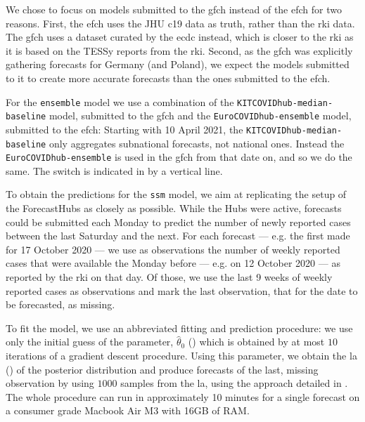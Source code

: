 We chose to focus on models submitted to the \acrshort{gfch} instead of the \acrshort{efch} for two reasons. 
First, the \acrshort{efch} uses the JHU \acrshort{c19} data \citep{Dong2020} as truth, rather than the \acrshort{rki} data. The \acrshort{gfch} uses a dataset curated by the \acrshort{ecdc} instead, which is closer to the \acrshort{rki} as it is based on the TESSy reports from the \acrshort{rki}. Second, as the \acrshort{gfch} was explicitly gathering forecasts for Germany (and Poland), we expect the models submitted to it to create more accurate forecasts than the ones submitted to the \acrshort{efch}. 

For the \texttt{ensemble} model we use a combination of the \texttt{KITCOVIDhub-median-baseline} model, submitted to the \acrshort{gfch} and the \texttt{EuroCOVIDhub-ensemble} model, submitted to the \acrshort{efch}: Starting with 10 April 2021, the \texttt{KITCOVIDhub-median-baseline} only aggregates subnational forecasts, not national ones. Instead the \texttt{EuroCOVIDhub-ensemble} is used in the \acrshort{gfch} from that date on, and so we do the same. The switch is indicated in  by a vertical line. 

To obtain the predictions for the \texttt{ssm} model, we aim at replicating the setup of the ForecastHubs as closely as possible. While the Hubs were active, forecasts could be submitted each Monday to predict the number of newly reported cases between the last Saturday and the next. For each forecast --- e.g. the first made for 17 October 2020 --- we use as observations the number of weekly reported cases that were available the Monday before --- e.g. on 12 October 2020 --- as reported by the \acrshort{rki} on that day. Of those, we use the last 9 weeks of weekly reported cases as observations and mark the last observation, that for the date to be forecasted, as missing. 

To fit the model, we use an abbreviated fitting and prediction procedure: we use only the initial guess of the parameter, $\hat\theta_{0}$ () which is obtained by at most $10$ iterations of a gradient descent procedure. Using this parameter, we obtain the \acrshort{la} () of the posterior distribution and produce forecasts of the last, missing observation by using $1000$ samples from the \acrshort{la}, using the approach detailed in . The whole procedure can run in approximately 10 minutes for a single forecast on a consumer grade Macbook Air M3 with 16GB of RAM. 

